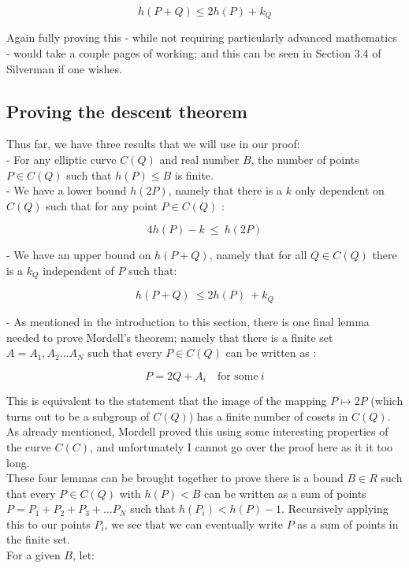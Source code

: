 \documentclass{article}
\begin{document}
\[h(P + Q) \leq 2h(P) + k_Q\]

Again fully proving this - while not requiring particularly advanced mathematics - would take a couple pages of working; and this can be seen in Section 3.4 of Silverman if one wishes.

\subsection{Proving the descent theorem}

Thus far, we have three results that we will use in our proof:\\

- For any elliptic curve $C(Q)$ and  real number $B$, the number of points $P \in C(Q)$ such that $h(P) \leq B$ is finite.\\

- We have a lower bound $h(2P)$, namely that there is a $k$ only dependent on $C(Q)$ such that for any point $P \in C(Q)$ :

\[ 4h(P) - k \ \leq \ h(2P) \]

- We have an upper bound on $h(P + Q)$, namely that for all $Q \in C(Q)$ there is a $k_Q$ independent of $P$ such that:

\[ h(P + Q) \ \leq 2h(P) \ + k_Q \]

- As mentioned in the introduction to this section, there is one final lemma needed to prove Mordell's theorem; namely that there is a finite set $A = {A_1, A_2 ... A_N}$ such that every $P \in C(Q)$ can be written as :

\[ P = 2Q + A_i \quad \text{for some} \ i \]

This is equivalent to the statement that the image of the mapping $P \mapsto 2P$ (which turns out to be a subgroup of $C(Q)$) has a finite number of cosets in $C(Q)$. As already mentioned, Mordell proved this using some interesting properties of the curve $C(C)$, and unfortunately I cannot go over the proof here as it it too long.\\

These four lemmas can be brought together to prove there is a bound $B \in R$ such that every $P \in C(Q)$ with $h(P) < B$ can be written as a sum of points $P = P_1 + P_2 + P_3 + \dots P_N$ such that $h(P_i) < h(P) - 1$. Recursively applying this to our points $P_i$, we see that we can eventually write $P$ as a sum of points in the finite set.\\

For a given $B$, let:
\end{document}
